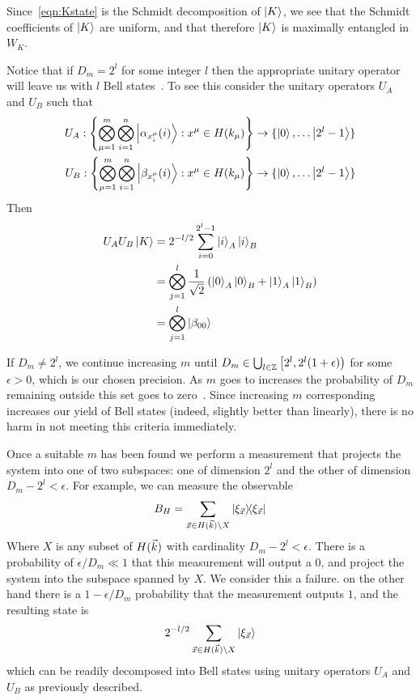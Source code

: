 Since~\eqref{eqn:Kstate} is the Schmidt decomposition of $\ket{K}$, we see that the Schmidt coefficients of $\ket{K}$ are uniform, and that therefore $\ket{K}$ is maximally entangled in $W_K$.

Notice that if $D_m = 2^l$ for some integer $l$ then the appropriate unitary operator will leave us with $l$ Bell states~\cite{bennett1996concentrating}. To see this consider the unitary operators $U_A$ and $U_B$ such that
\begin{align*}
U_A : \left\{
\bigotimes_{\mu=1}^m\bigotimes_{i=1}^n 
\ket{\alpha_{x_i^\mu}(i)}: x^\mu \in H(k_\mu) 
\right\} &\rightarrow \{\ket{0}, \ldots \ket{2^l-1
}\} \\
U_B :\left\{
\bigotimes_{\mu=1}^m\bigotimes_{i=1}^n 
\ket{\beta_{x_i^\mu}(i)}: x^\mu \in H(k_\mu) 
\right\} &\rightarrow \{\ket{0}, \ldots \ket{2^l-1
}\}
\end{align*}
Then
\begin{align*}
U_A U_B \ket{K} &= 2^{-l/2}\sum_{i=0}^{2^l-1} \ket{i}_A\ket{i}_B\\
&= \bigotimes_{j=1}^l \frac{1}{\sqrt{2}} \left(  \ket{0}_A \ket{0}_B + \ket{1}_A \ket{1}_B \right) \\
&= \bigotimes_{j=1}^l \ket{\beta_{00}}
\end{align*}

If $D_m \neq 2^l$, we continue increasing $m$ until $D_m \in \bigcup_{l \in \mathbb{Z} }\left[2^l, 2^l(1+\epsilon)\right)$ for some $\epsilon > 0$, which is our chosen precision. As $m$ goes to increases the probability of $D_m$ remaining outside this set goes to zero~\cite{bennett1996concentrating}.
Since increasing $m$ corresponding increases our yield of Bell states (indeed, slightly better than linearly), there is no harm in not meeting this criteria immediately.

Once a suitable $m$ has been found we perform a measurement that projects the system into one of two subspaces: one of dimension $2^l$ and the other of dimension $D_m-2^l<\epsilon$. For example, we can measure the observable
$$
B_H = \sum_{\vx \in H(\vk) \setminus X} \dyad{ \xi_\vx }{ \xi_\vx } 
$$
Where $X$ is any subset of $H({\vec{k}})$ with cardinality $D_m - 2^l<\epsilon$.
There is a probability of $\epsilon / D_m \ll 1
$ that this measurement will output a $0$, and project the system into the subspace spanned by $X$. We consider this a failure. on the other hand there is a $1-\epsilon / D_m$ probability that the measurement outputs $1$, and the resulting state is
$$
2^{-l/2} \sum_{{\vec{x}} \in H({\vec{k}}) \setminus X} \ket{ \xi_{\vec{x}} }
$$
which can be readily decomposed into Bell states using unitary operators $U_A$ and $U_B$ as previously described.
